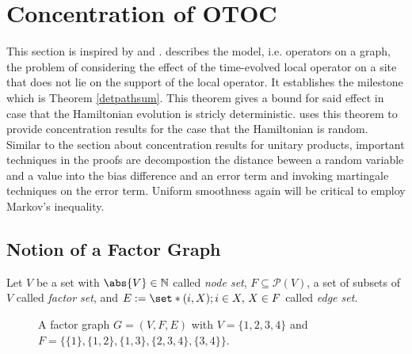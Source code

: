 \section{Concentration of OTOC}

This section is inspired by \cite{chen2021operatorgrowth} and \cite{chen2021otoc}. \cite{chen2021operatorgrowth} describes the model, i.e. operators on a graph, the problem of considering the effect of the time-evolved local operator on a site that does not lie on the support of the local operator. It establishes the milestone which is Theorem \ref{detpathsum}. This theorem gives a bound for said effect in case that the Hamiltonian evolution is stricly deterministic. \cite{chen2021otoc} uses this theorem to provide concentration results for the case that the Hamiltonian is random. Similar to the section about concentration results for unitary products, important techniques in the proofs are decompostion the distance beween a random variable and a value into the bias difference and an error term and invoking martingale techniques on the error term. Uniform smoothness again will be critical to employ Markov's inequality. 


\subsection{Notion of a Factor Graph}

\begin{defn}
    Let \(V\) be a set with \(\abs{V} \in \mathbb{N}\) called \emph{node set}, \(F \subseteq \mathcal{P}(V)\), a set of subsets of \(V\) called \emph{factor set}, and \(E:= \set*{(i,X); i \in X,\, X \in F}\) called \emph{edge set}. 
\end{defn}


\begin{figure}[H]
    \centering
      
      \captionsetup{width=.6\linewidth}
      \caption{A factor graph \(G=(V,F,E)\) with \(V=\{1,2,3,4\}\) and \(F=\{\{1\},\{1,2\}, \{1,3\}, \{2,3,4\},\{3,4\}\}\).} 
  \end{figure}


